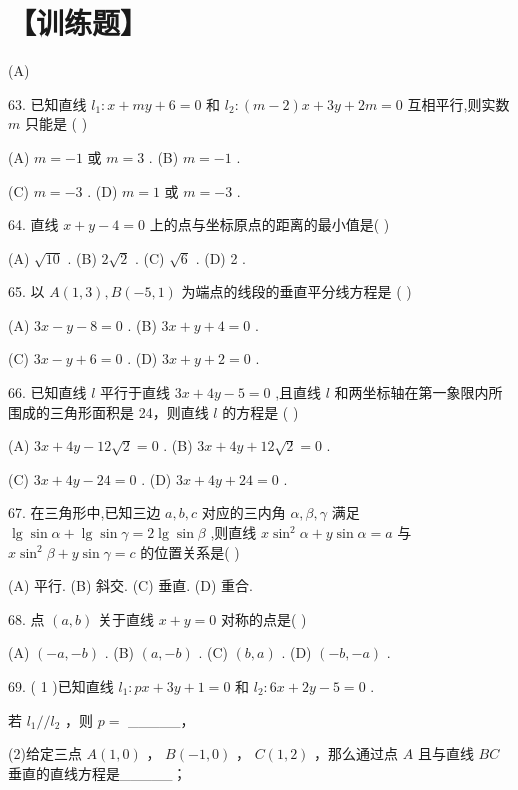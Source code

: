 \documentclass[10pt]{article}
\newcommand*\circled[1]{\tikz[baseline=(char.base)]{\node[shape=circle,draw,inner sep=1.5pt] (char) {\small #1};}}
\begin{document}
\section*{【训练题】}

(A)

63. 已知直线 \({l}_{1} : x + {my} + 6 = 0\) 和 \({l}_{2} : \left( {m - 2}\right) x + {3y} + {2m} = 0\) 互相平行,则实数 \(m\) 只能是 ( )

(A) \(m =  - 1\) 或 \(m = 3\) . (B) \(m =  - 1\) .

(C) \(m =  - 3\) . (D) \(m = 1\) 或 \(m =  - 3\) .

64. 直线 \(x + y - 4 = 0\) 上的点与坐标原点的距离的最小值是( )

(A) \(\sqrt{10}\) . (B) \(2\sqrt{2}\) . (C) \(\sqrt{6}\) . (D) 2 .

65. 以 \(A\left( {1,3}\right) ,B\left( {-5,1}\right)\) 为端点的线段的垂直平分线方程是 ( )

(A) \({3x} - y - 8 = 0\) . (B) \({3x} + y + 4 = 0\) .

(C) \({3x} - y + 6 = 0\) . (D) \({3x} + y + 2 = 0\) .

66. 已知直线 \(l\) 平行于直线 \({3x} + {4y} - 5 = 0\) ,且直线 \(l\) 和两坐标轴在第一象限内所围成的三角形面积是 24，则直线 \(l\) 的方程是 ( )

(A) \({3x} + {4y} - {12}\sqrt{2} = 0\) . (B) \({3x} + {4y} + {12}\sqrt{2} = 0\) .

(C) \({3x} + {4y} - {24} = 0\) . (D) \({3x} + {4y} + {24} = 0\) .

67. 在三角形中,已知三边 \(a,b,c\) 对应的三内角 \(\alpha ,\beta ,\gamma\) 满足 \(\lg \sin \alpha  + \lg \sin \gamma  = 2\lg \sin \beta\) ,则直线 \(x{\sin }^{2}\alpha  + y\sin \alpha  = a\) 与 \(x{\sin }^{2}\beta  + y\sin \gamma  = c\) 的位置关系是( )

(A) 平行. (B) 斜交. (C) 垂直. (D) 重合.

68. 点 \(\left( {a,b}\right)\) 关于直线 \(x + y = 0\) 对称的点是( )

(A) \(\left( {-a, - b}\right)\) . (B) \(\left( {a, - b}\right)\) . (C) \(\left( {b,a}\right)\) . (D) \(\left( {-b, - a}\right)\) .

69. ( 1 )已知直线 \({l}_{1} : {px} + {3y} + 1 = 0\) 和 \({l}_{2} : {6x} + {2y} - 5 = 0\) .

 \circled{1} 若 \({l}_{1}//{l}_{2}\) ，则 \(p =\) \_\_\_\_\_，

(2)给定三点 \(A\left( {1,0}\right)\) ， \(B\left( {-1,0}\right)\) ， \(C\left( {1,2}\right)\) ，那么通过点 \(A\) 且与直线 \({BC}\) 垂直的直线方程是\_\_\_\_\_；
\end{document}
